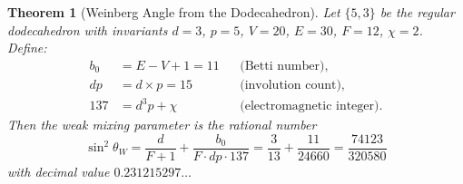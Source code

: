 \documentclass[11pt,a4paper]{article}
\theoremstyle{plain}
\newtheorem{theorem}{Theorem}[section]
\theoremstyle{definition}
\newcommand{\sw}{\sin^{2}\!\theta_{W}}
\begin{document}
\begin{theorem}[Weinberg Angle from the Dodecahedron]\label{thm:main}
Let $\{5,3\}$ be the regular dodecahedron with invariants
$d = 3$, $p = 5$, $V = 20$, $E = 30$, $F = 12$, $\chi = 2$.
Define:
\begin{align}
  b_{0} &= E - V + 1 = 11 & &\text{(Betti number)}, \label{eq:b0-def}\\
  dp &= d \times p = 15 & &\text{(involution count)}, \label{eq:dp-def}\\
  137 &= d^{3}p + \chi & &\text{(electromagnetic integer)}. \label{eq:137-def}
\end{align}
Then the weak mixing parameter is the rational number
\begin{equation}\label{eq:main}
  \boxed{\;
    \sw
    = \frac{d}{F+1} + \frac{b_{0}}{F \cdot dp \cdot 137}
    = \frac{3}{13} + \frac{11}{24660}
    = \frac{74123}{320580}
  \;}
\end{equation}
with decimal value $0.231215297\ldots$
\end{theorem}
\end{document}
